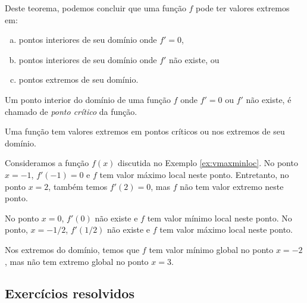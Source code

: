 Deste teorema, podemos concluir que uma função $f$ pode ter valores extremos em:
\begin{enumerate}[a)]
\item pontos interiores de seu domínio onde $f' = 0$,
\item pontos interiores de seu domínio onde $f'$ não existe, ou
\item pontos extremos de seu domínio.
\end{enumerate}

Um ponto interior do domínio de uma função $f$ onde $f'=0$ ou $f'$ não existe, é chamado de \emph{ponto crítico} da função.

\begin{obs}\label{obs:pt_critico_val_extremo}
  Uma função tem valores extremos em pontos críticos ou nos extremos de seu domínio.
\end{obs}


\begin{ex}
  Consideramos a função $f(x)$ discutida no Exemplo \ref{ex:vmaxminloc}. No ponto $x=-1$, $f'(-1)=0$ e $f$ tem valor máximo local neste ponto. Entretanto, no ponto $x=2$, também temos $f'(2)=0$, mas $f$ não tem valor extremo neste ponto.

  No ponto $x=0$, $f'(0)$ não existe e $f$ tem valor mínimo local neste ponto. No ponto, $x=-1/2$, $f'(1/2)$ não existe e $f$ tem valor máximo local neste ponto.

  Nos extremos do domínio, temos que $f$ tem valor mínimo global no ponto $x=-2$, mas não tem extremo global no ponto $x=3$.
\end{ex}

\subsection{Exercícios resolvidos}


